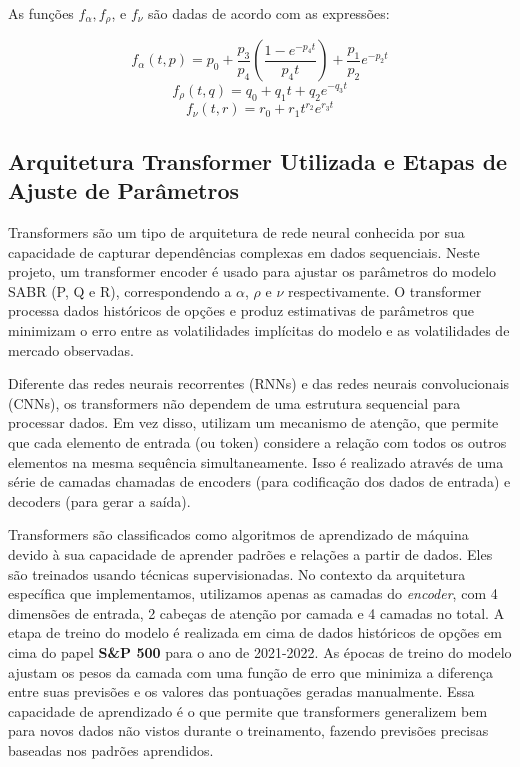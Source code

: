 As funções $f_{\alpha}, f_{\rho}$, e $f_{\nu}$ são dadas de acordo com as expressões:

\begin{equation}
	f_{\alpha}(t, p) = p_0 + \frac{p_3}{p_4} \left( \frac{1 - e^{-p_4 t}}{p_4 t} \right) + \frac{p_1}{p_2} e^{-p_2 t}
\end{equation}
\begin{equation}
	f_{\rho}(t, q) = q_0 + q_1 t + q_2 e^{-q_3 t}
\end{equation}
\begin{equation}
	f_{\nu}(t, r) = r_0 + r_1 t^{r_2} e^{r_3 t}
\end{equation}

\subsection{Arquitetura Transformer Utilizada e Etapas de Ajuste de Parâmetros}

Transformers são um tipo de arquitetura de rede neural conhecida por sua capacidade de capturar dependências complexas em dados sequenciais. Neste projeto, um transformer encoder é usado para ajustar os parâmetros do modelo SABR (P, Q e R), correspondendo a \(\alpha\), \(\rho\) e \(\nu\) respectivamente. O transformer processa dados históricos de opções e produz estimativas de parâmetros que minimizam o erro entre as volatilidades implícitas do modelo e as volatilidades de mercado observadas.

Diferente das redes neurais recorrentes (RNNs) e das redes neurais convolucionais (CNNs), os transformers não dependem de uma estrutura sequencial para processar dados. Em vez disso, utilizam um mecanismo de atenção, que permite que cada elemento de entrada (ou token) considere a relação com todos os outros elementos na mesma sequência simultaneamente. Isso é realizado através de uma série de camadas chamadas de encoders (para codificação dos dados de entrada) e decoders (para gerar a saída).

Transformers são classificados como algoritmos de aprendizado de máquina devido à sua capacidade de aprender padrões e relações a partir de dados. Eles são treinados usando técnicas supervisionadas. No contexto da arquitetura específica que implementamos, utilizamos apenas as camadas do \textit{encoder}, com 4 dimensões de entrada, 2 cabeças de atenção por camada e 4 camadas no total. A etapa de treino do modelo é realizada em cima de dados históricos de opções em cima do papel \textbf{S\&P 500} para o ano de 2021-2022. As épocas de treino do modelo ajustam os pesos da camada com uma função de erro que minimiza a diferença entre suas previsões e os valores das pontuações geradas manualmente. Essa capacidade de aprendizado é o que permite que transformers generalizem bem para novos dados não vistos durante o treinamento, fazendo previsões precisas baseadas nos padrões aprendidos.

